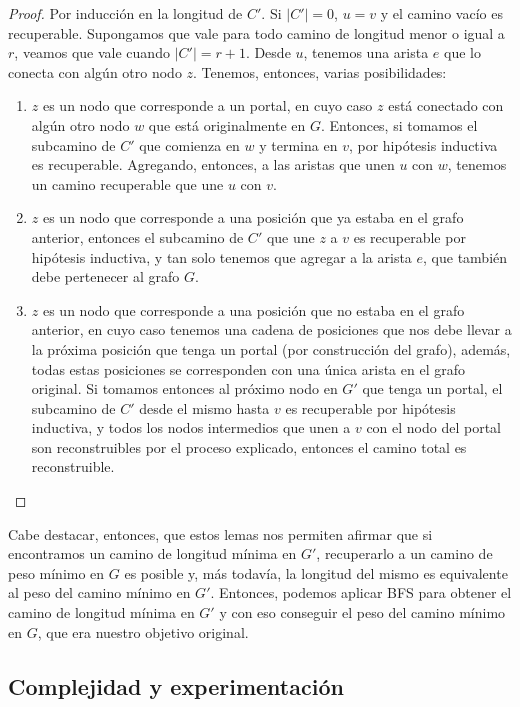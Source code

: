 \documentclass{article}
\theoremstyle{definition}
\theoremstyle{remark}
\begin{document}
\begin{proof}
Por inducción en la longitud de $C'$. Si $|C'| = 0$, $u = v$ y el camino vacío es recuperable.
Supongamos que vale para todo camino de longitud menor o igual a $r$, veamos que vale cuando $|C'| = r + 1$. Desde $u$, tenemos una arista $e$ que lo conecta con algún otro nodo $z$. Tenemos, entonces, varias posibilidades:

\begin{enumerate}
\item $z$ es un nodo que corresponde a un portal, en cuyo caso $z$ está conectado con algún otro nodo $w$ que está originalmente en $G$. Entonces, si tomamos el subcamino de $C'$ que comienza en $w$ y termina en $v$, por hipótesis inductiva es recuperable. Agregando, entonces, a las aristas que unen $u$ con $w$, tenemos un camino recuperable que une $u$ con $v$.

\item $z$ es un nodo que corresponde a una posición que ya estaba en el grafo anterior, entonces el subcamino de $C'$ que une $z$ a $v$ es recuperable por hipótesis inductiva, y tan solo tenemos que agregar a la arista $e$, que también debe pertenecer al grafo $G$. 

\item $z$ es un nodo que corresponde a una posición que no estaba en el grafo anterior, en cuyo caso tenemos una cadena de posiciones que nos debe llevar a la próxima posición que tenga un portal (por construcción del grafo), además, todas estas posiciones se corresponden con una única arista en el grafo original. Si tomamos entonces al próximo nodo en $G'$ que tenga un portal, el subcamino de $C'$ desde el mismo hasta $v$ es recuperable por hipótesis inductiva, y todos los nodos intermedios que unen a $v$ con el nodo del portal son reconstruibles por el proceso explicado, entonces el camino total es reconstruible.
\end{enumerate}
\end{proof}

Cabe destacar, entonces, que estos lemas nos permiten afirmar que si encontramos un camino de longitud mínima en $G'$, recuperarlo a un camino de peso mínimo en $G$ es posible y, más todavía, la longitud del mismo es equivalente al peso del camino mínimo en $G'$. Entonces, podemos aplicar BFS para obtener el camino de longitud mínima en $G'$ y con eso conseguir el peso del camino mínimo en $G$, que era nuestro objetivo original.

\subsection{Complejidad y experimentación}
\end{document}
